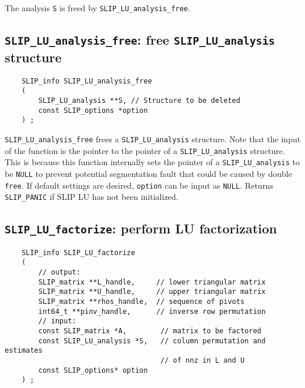 \documentclass[12pt]{article}
\theoremstyle{definition}
\begin{document}
The analysis \verb|S| is freed by \verb|SLIP_LU_analysis_free|.

\cprotect\subsection{\verb|SLIP_LU_analysis_free|: free \verb|SLIP_LU_analysis| structure}
\label{ss:LU_analysis_free}

\begin{mdframed}[userdefinedwidth=6in]
{\footnotesize
\begin{verbatim}
    SLIP_info SLIP_LU_analysis_free
    (
        SLIP_LU_analysis **S, // Structure to be deleted
        const SLIP_options *option
    ) ;
\end{verbatim}
} \end{mdframed}


\verb|SLIP_LU_analysis_free| frees a \verb|SLIP_LU_analysis| structure.
Note that the input of the function is the pointer to the pointer of a
\verb|SLIP_LU_analysis| structure. This is because this function internally
sets the pointer of a \verb|SLIP_LU_analysis| to be \verb|NULL| to prevent
potential segmentation fault that could be caused by double \verb|free|.
If default settings are desired, \verb|option| can be input as \verb|NULL|.
Returns \verb|SLIP_PANIC| if SLIP LU has not been initialized.

\cprotect\subsection{\verb|SLIP_LU_factorize|: perform LU factorization}
\label{ss:SLIP_LU_factorize}

\begin{mdframed}[userdefinedwidth=6in]
{\footnotesize
\begin{verbatim}
    SLIP_info SLIP_LU_factorize
    (
        // output:
        SLIP_matrix **L_handle,     // lower triangular matrix
        SLIP_matrix **U_handle,     // upper triangular matrix
        SLIP_matrix **rhos_handle,  // sequence of pivots
        int64_t **pinv_handle,      // inverse row permutation
        // input:
        const SLIP_matrix *A,        // matrix to be factored
        const SLIP_LU_analysis *S,   // column permutation and estimates
                                     // of nnz in L and U 
        const SLIP_options* option
    ) ;
\end{verbatim}
} \end{mdframed}
\end{document}
